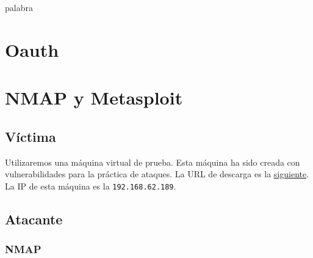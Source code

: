 \documentclass[a4,12pt,onecolum]{article}
\begin{document}

\thispagestyle{empty}
\textcolor[rgb]{1.00,1.00,1.00}{palabra} %
\newpage

\setcounter{page}{3}


\newpage
\tableofcontents 		%
\newpage





\clearpage
\section{Oauth}






\clearpage
\section{NMAP y Metasploit}

\subsection{Víctima}
Utilizaremos una máquina virtual de prueba. Esta máquina ha sido creada con vulnerabilidades para la práctica de ataques. La URL de descarga es la \href{wiki.inf.um.es/metasploitable2/metasploitable-linux-2.0.0.zip}{siguiente}. \\

La IP de esta máquina es la \texttt{192.168.62.189}.

\subsection{Atacante}

\subsubsection{NMAP}
\end{document}
